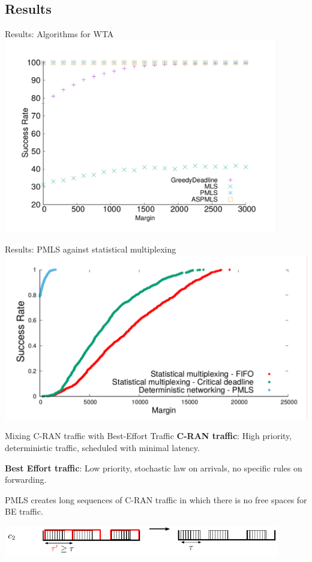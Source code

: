 \documentclass[10 pt]{beamer}
\begin{document}
\subsection{Results}
\begin{frame}{Results: Algorithms for WTA}
\centering
\includegraphics[width=0.9\textwidth]{retour_210002.pdf}

\end{frame}
\begin{frame}{Results: PMLS against statistical multiplexing}
\centering
\includegraphics[width=\textwidth]{stochastic2.pdf}
\end{frame}



\begin{frame}{Mixing C-RAN traffic with Best-Effort Traffic}
\textbf{C-RAN traffic}: High priority, deterministic traffic, scheduled with minimal latency.

\vspace{0.5cm}

\pause
\textbf{Best Effort traffic}: Low priority, stochastic law on arrivals, no specific rules on forwarding.

\vspace{0.5cm}

\pause
PMLS creates long sequences of C-RAN traffic in which there is no free spaces for BE traffic.

\vspace{1cm}
\pause
\centering
\includegraphics[width=0.9\textwidth]{space.pdf}

\end{frame}
\end{document}
